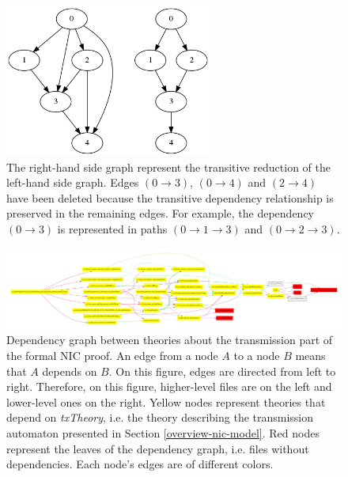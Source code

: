 \documentclass{kththesis}
\begin{document}
{\begin{figure}[p]
	\includegraphics[height=5cm]{figures/transitive-reduction.png}
	\centering
	\caption{The right-hand side graph represent the transitive reduction of the left-hand side graph. Edges $(0 \rightarrow 3)$, $(0 \rightarrow 4)$ and $(2 \rightarrow 4)$ have been deleted because the transitive dependency relationship is preserved in the remaining edges. For example, the dependency $(0 \rightarrow 3)$ is represented in paths $(0 \rightarrow 1  \rightarrow 3)$ and $(0 \rightarrow 2 \rightarrow 3)$.}
	\label{transitive-reduction}
\end{figure}

\begin{figure}[p]
	\includegraphics[width=\textwidth]{figures/depgraph-nic-tx-files.pdf}
	\centering
	\caption{Dependency graph between theories about the transmission part of the formal NIC proof. An edge from a node $A$ to a node $B$ means that $A$ depends on $B$. On this figure, edges are directed from left to right. Therefore, on this figure, higher-level files are on the left and lower-level ones on the right. Yellow nodes represent theories that depend on \textit{txTheory}, i.e. the theory describing the transmission automaton presented in Section \ref{overview-nic-model}. Red nodes represent the leaves of the dependency graph, i.e. files without dependencies. Each node's edges are of different colors.}
	\label{depgraph-nic-tx-files}
\end{figure}

}
\end{document}
